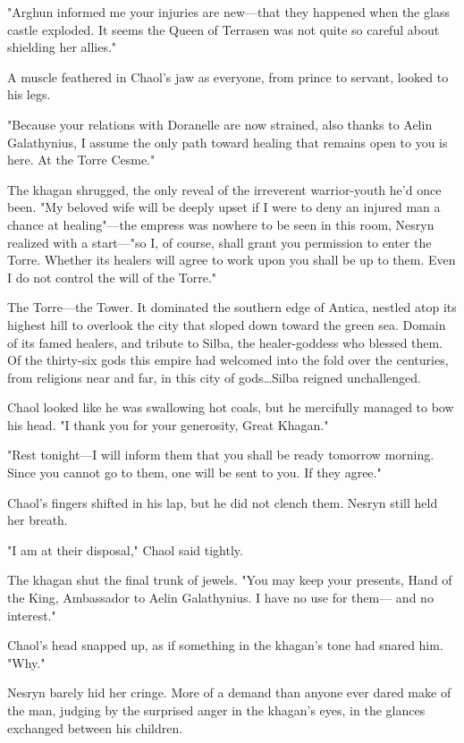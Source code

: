 "Arghun informed me your injuries are new---that they happened when the glass castle exploded.
It seems the Queen of Terrasen was not quite so careful about shielding her allies."

A muscle feathered in Chaol's jaw as everyone, from prince to servant, looked to his legs.

"Because your relations with Doranelle are now strained, also thanks to Aelin Galathynius, I assume the only path toward healing that remains open to you is here.
At the Torre Cesme."

The khagan shrugged, the only reveal of the irreverent warrior-youth he'd once been.
"My beloved wife will be deeply upset if I were to deny an injured man a chance at healing"---the empress was nowhere to be seen in this room, Nesryn realized with a start---"so I, of course, shall grant you permission to enter the Torre.
Whether its healers will agree to work upon you shall be up to them.
Even I do not control the will of the Torre."

The Torre---the Tower.
It dominated the southern edge of Antica, nestled atop its highest hill to overlook the city that sloped down toward the green sea.
Domain of its famed healers, and tribute to Silba, the healer-goddess who blessed them.
Of the thirty-six gods this empire had welcomed into the fold over the centuries, from religions near and far, in this city of gods\ldots Silba reigned unchallenged.

Chaol looked like he was swallowing hot coals, but he mercifully managed to bow his head.
"I thank you for your generosity, Great Khagan."

"Rest tonight---I will inform them that you shall be ready tomorrow morning.
Since you cannot go to them, one will be sent to you.
If they agree."

Chaol's fingers shifted in his lap, but he did not clench them.
Nesryn still held her breath.

"I am at their disposal," Chaol said tightly.

The khagan shut the final trunk of jewels.
"You may keep your presents, Hand of the King, Ambassador to Aelin Galathynius.
I have no use for them--- and no interest."

Chaol's head snapped up, as if something in the khagan's tone had snared him.
"Why."

Nesryn barely hid her cringe.
More of a demand than anyone ever dared make of the man, judging by the surprised anger in the khagan's eyes, in the glances exchanged between his children.

